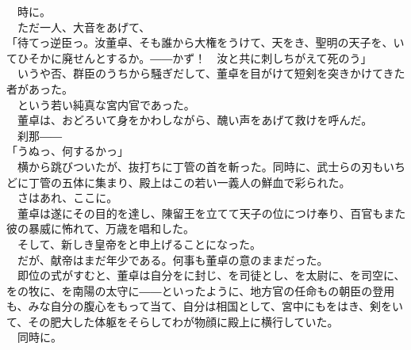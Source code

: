 \documentclass[
  paper=a5,
  fontsize=10pt,
  jafontsize=9.5pt,
  tate,                  %
  open_bracket_pos=nibu, %
]{jlreq}
\begin{document}
　時に。\\


　ただ一人、大音をあげて、\\


「待てっ逆臣っ。汝董卓、そも誰から大権をうけて、天をき、聖明の天子を、いてひそかに廃せんとするか。――かず！　汝と共に刺しちがえて死のう」\\


　いうや否、群臣のうちから騒ぎだして、董卓を目がけて短剣を突きかけてきた者があった。\\


　という若い純真な宮内官であった。\\


　董卓は、おどろいて身をかわしながら、醜い声をあげて救けを呼んだ。\\


　刹那――\\


「うぬっ、何するかっ」\\


　横から跳びついたが、抜打ちに丁管の首を斬った。同時に、武士らの刃もいちどに丁管の五体に集まり、殿上はこの若い一義人の鮮血で彩られた。\\


　さはあれ、ここに。\\


　董卓は遂にその目的を達し、陳留王を立てて天子の位につけ奉り、百官もまた彼の暴威に怖れて、万歳を唱和した。\\


　そして、新しき皇帝をと申上げることになった。\\


　だが、献帝はまだ年少である。何事も董卓の意のままだった。\\


　即位の式がすむと、董卓は自分をに封じ、を司徒とし、を太尉に、を司空に、をの牧に、を南陽の太守に――といったように、地方官の任命もの朝臣の登用も、みな自分の腹心をもって当て、自分は相国として、宮中にもをはき、剣をいて、その肥大した体躯をそらしてわが物顔に殿上に横行していた。\\


　同時に。\\
\end{document}
